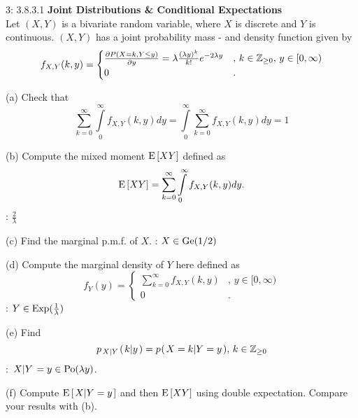 \documentclass[a4paper,twoside=false,abstract=false,numbers=noenddot,
titlepage=false,headings=small,parskip=half,version=last]{scrartcl}
\begin{document}
\begin{exercise}{3: 3.8.3.1}
    \textbf{Joint Distributions \& Conditional Expectations} \\
    Let $(X, Y)$ is a bivariate random variable, where $X$ is discrete and $Y$
    is continuous. $(X, Y)$ has a joint probability mass - and density function
    given by
    \begin{equation}
        f_{X,Y}(k, y) = \begin{cases}
            \frac{\partial{P(X=k, Y\le y)}}{\partial{y}} =
            \lambda\frac{(\lambda y)^k}{k!}e^{-2\lambda y}
                    &,\, k\in\mathbb{Z}_{\ge 0},\, y\in [0, \infty) \\
            0       &.
        \end{cases}
    \end{equation}

    (a) Check that
    \begin{equation}
        \sum\limits_{k=0}^\infty \int\limits_0^\infty f_{X,Y}(k,y)dy =
        \int\limits_0^\infty \sum\limits_{k=0}^\infty f_{X,Y}(k,y)dy = 1
    \end{equation}

    (b) Compute the mixed moment ${\rm E}\,[XY]$ defined as
    \begin{equation}
        {\rm E}\,[XY] =
        \sum\limits_{k=0}^\infty \int\limits_0^\infty f_{X,Y}(k,y)dy.
    \end{equation}
    \Answer: $\frac{2}{\lambda}$

    (c) Find the marginal p.m.f. of $X$.
    \Answer: $X\in\text{Ge}(1/2)$

    (d) Compute the marginal density of $Y$ here defined as
    \begin{equation}
        f_Y(y) = \begin{cases}
            \sum\limits_{k=0}^\infty f_{X,Y}(k,y) &, \, y\in[0,\infty) \\
             0                                    &.
        \end{cases}
    \end{equation}
    \Answer: $Y\in\text{Exp}(\frac{1}{\lambda})$

    (e) Find
    \begin{equation}
        p_{\left. X \middle\vert Y \right.} (\left. k \middle\vert y \right.) =
        p_{} (\left. X=k \middle\vert Y=y \right.), \, k\in\mathbb{Z}_{\ge 0}
    \end{equation}
    \Answer: $\left. X \middle\vert Y \right. = y\in\text{Po}(\lambda y)$.

    (f) Compute ${\rm E}\,[\left. X \middle\vert Y=y \right.]$ and then ${\rm E}\,[XY]$ using
    double expectation. Compare your results with (b).
\end{exercise}
\begin{solution}
\end{solution}
\pagebreak
\end{document}
